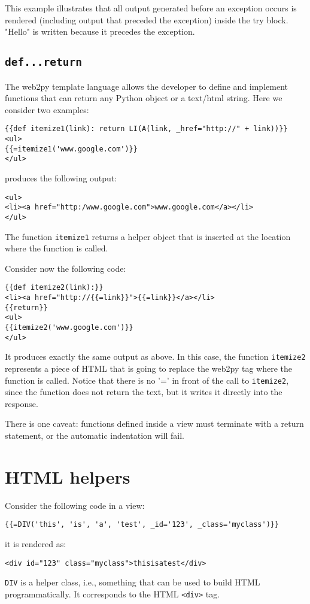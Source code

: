 \documentclass[justified,sixbynine,notoc]{tufte-book}
\def\ft{\small\tt}
\def\inxx#1{\index{#1}}
\begin{document}
\begin{fullwidth}
This example illustrates that all output generated before an exception occurs is rendered (including output that preceded the exception) inside the try block. "Hello" is written because it precedes the exception.

\goodbreak\subsection{{\ft def...return}}

\inxx{def} \inxx{return}

The web2py template language allows the developer to define and implement functions that can return any Python object or a text/html string. Here we consider two examples:
\begin{lstlisting}[keywords={}]
{{def itemize1(link): return LI(A(link, _href="http://" + link))}}
<ul>
{{=itemize1('www.google.com')}}
</ul>
\end{lstlisting}
\noindent produces the following output:
\begin{lstlisting}[keywords={}]
<ul>
<li><a href="http:/www.google.com">www.google.com</a></li>
</ul>
\end{lstlisting}

The function {\ft itemize1} returns a helper object that is inserted at the location where the function is called.

Consider now the following code:
\begin{lstlisting}[keywords={}]
{{def itemize2(link):}}
<li><a href="http://{{=link}}">{{=link}}</a></li>
{{return}}
<ul>
{{itemize2('www.google.com')}}
</ul>
\end{lstlisting}

It produces exactly the same output as above. In this case, the function {\ft itemize2} represents a piece of HTML that is going to replace the web2py tag where the function is called. Notice that there is no '=' in front of the call to {\ft itemize2}, since the function does not return the text, but it writes it directly into the response.

There is one caveat: functions defined inside a view must terminate with a return statement, or the automatic indentation will fail.

\goodbreak\section{HTML helpers}

\inxx{helpers}

Consider the following code in a view:
\begin{lstlisting}[keywords={}]
{{=DIV('this', 'is', 'a', 'test', _id='123', _class='myclass')}}
\end{lstlisting}
\noindent it is rendered as:
\begin{lstlisting}[keywords={}]
<div id="123" class="myclass">thisisatest</div>
\end{lstlisting}
{\ft DIV} is a helper class, i.e., something that can be used to build HTML programmatically. It corresponds to the HTML {\ft <div>} tag.


\end{fullwidth}
\end{document}
